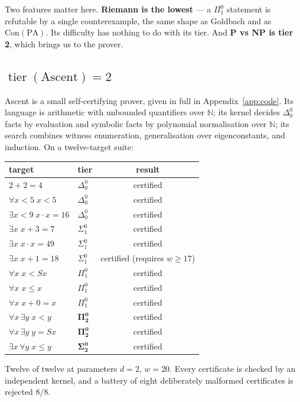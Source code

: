\documentclass[11pt,a4paper]{article}
\newcommand{\Sig}[2]{\Sigma^{#1}_{#2}}
\newcommand{\Pai}[2]{\Pi^{#1}_{#2}}
\newcommand{\Del}[2]{\Delta^{#1}_{#2}}
\newcommand{\tier}{\operatorname{tier}}
\begin{document}
Two features matter here. \textbf{Riemann is the lowest} --- a $\Pai{0}{1}$
statement is refutable by a single counterexample, the same shape as Goldbach
and as $\mathrm{Con}(\mathrm{PA})$. Its difficulty has nothing to do with its
tier. And \textbf{P vs NP is tier 2}, which brings us to the prover.

\subsection{$\tier(\text{Ascent}) = 2$}

Ascent is a small self-certifying prover, given in full in
Appendix~\ref{app:code}. Its language is arithmetic with unbounded quantifiers
over $\mathbb{N}$; its kernel decides $\Del{0}{0}$ facts by evaluation and
symbolic facts by polynomial normalisation over $\mathbb{N}$; its search
combines witness enumeration, generalisation over eigenconstants, and
induction. On a twelve-target suite:

\begin{center}
\begin{tabular}{@{}llc@{}}
\toprule
target & tier & result \\
\midrule
$2+2 = 4$ & $\Del{0}{0}$ & certified \\
$\forall x{<}5\; x < 5$ & $\Del{0}{0}$ & certified \\
$\exists x{<}9\; x\cdot x = 16$ & $\Del{0}{0}$ & certified \\
$\exists x\; x+3 = 7$ & $\Sig{0}{1}$ & certified \\
$\exists x\; x\cdot x = 49$ & $\Sig{0}{1}$ & certified \\
$\exists x\; x+1 = 18$ & $\Sig{0}{1}$ & certified (requires $w \ge 17$) \\
$\forall x\; x < Sx$ & $\Pai{0}{1}$ & certified \\
$\forall x\; x \le x$ & $\Pai{0}{1}$ & certified \\
$\forall x\; x+0 = x$ & $\Pai{0}{1}$ & certified \\
$\forall x\, \exists y\; x < y$ & $\mathbf{\Pai{0}{2}}$ & certified \\
$\forall x\, \exists y\; y = Sx$ & $\mathbf{\Pai{0}{2}}$ & certified \\
$\exists x\, \forall y\; x \le y$ & $\mathbf{\Sig{0}{2}}$ & certified \\
\bottomrule
\end{tabular}
\end{center}

Twelve of twelve at parameters $d = 2$, $w = 20$. Every certificate is checked
by an independent kernel, and a battery of eight deliberately malformed
certificates is rejected $8/8$.
\end{document}
